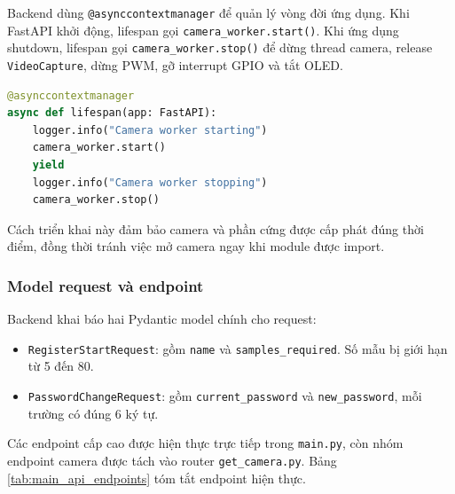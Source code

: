Backend dùng \texttt{@asynccontextmanager} để quản lý vòng đời ứng dụng. Khi FastAPI khởi động, lifespan gọi \texttt{camera\_worker.start()}. Khi ứng dụng shutdown, lifespan gọi \texttt{camera\_worker.stop()} để dừng thread camera, release \texttt{VideoCapture}, dừng PWM, gỡ interrupt GPIO và tắt OLED.

\begin{lstlisting}[language=Python, caption={Lifespan khởi động và dừng camera worker}]
@asynccontextmanager
async def lifespan(app: FastAPI):
    logger.info("Camera worker starting")
    camera_worker.start()
    yield
    logger.info("Camera worker stopping")
    camera_worker.stop()
\end{lstlisting}

Cách triển khai này đảm bảo camera và phần cứng được cấp phát đúng thời điểm, đồng thời tránh việc mở camera ngay khi module được import.

\subsubsection{Model request và endpoint}

Backend khai báo hai Pydantic model chính cho request:

\begin{itemize}
    \item \texttt{RegisterStartRequest}: gồm \texttt{name} và \texttt{samples\_required}. Số mẫu bị giới hạn từ 5 đến 80.
    \item \texttt{PasswordChangeRequest}: gồm \texttt{current\_password} và \texttt{new\_password}, mỗi trường có đúng 6 ký tự.
\end{itemize}

Các endpoint cấp cao được hiện thực trực tiếp trong \texttt{main.py}, còn nhóm endpoint camera được tách vào router \texttt{get\_camera.py}. Bảng \ref{tab:main_api_endpoints} tóm tắt endpoint hiện thực.

